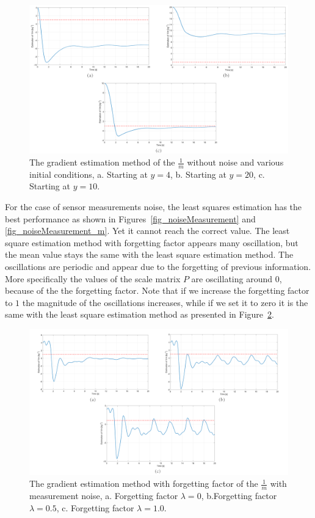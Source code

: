 \documentclass[12pt]{article}
\newenvironment{question}[2][Question]{\begin{trivlist}
\item[\hskip \labelsep {\bfseries #1}\hskip \labelsep {\bfseries #2.}]}{\end{trivlist}}
\begin{document}
\begin{question}{3}
\begin{figure}[!h]
	\includegraphics[width=.95\columnwidth]{figures/gradient_noiseFree_variousgx0.png}
	\centering
	\caption{The gradient estimation method of the $\frac{1}{m}$ without noise and various initial conditions, a. Starting at $y=4$, b. Starting at $y=20$, c. Starting at $y=10$.}
	\label{fig_noise_variousx0}
\end{figure}

For the case of sensor measurements noise, the least squares estimation has the best performance as shown in Figures~\ref{fig_noiseMeasurement} and \ref{fig_noiseMeasurement_m}. Yet it cannot reach the correct value. The least square estimation method with forgetting factor appears many oscillation, but the mean value stays the same with the least square estimation method. The oscillations are periodic and appear due to the forgetting of previous information. More specifically the values of the scale matrix $P$ are oscillating around 0, because of the the forgetting factor. Note that if we increase the forgetting factor to $1$ the magnitude of the oscillations increases, while if we set it to zero it is the same with the least square estimation method as presented in Figure~\ref{fig_forgettingMeasurement_various_lambda}.

\begin{figure}[!h]
	\includegraphics[width=.95\columnwidth]{figures/LS_forgetting_various_lambda.png}
	\centering
	\caption{The gradient estimation method with forgetting factor of the $\frac{1}{m}$ with measurement noise, a. Forgetting factor $\lambda=0$, b.Forgetting factor $\lambda=0.5$, c. Forgetting factor $\lambda=1.0$.}
	\label{fig_forgettingMeasurement_various_lambda}
\end{figure}
\end{question}
\end{document}
